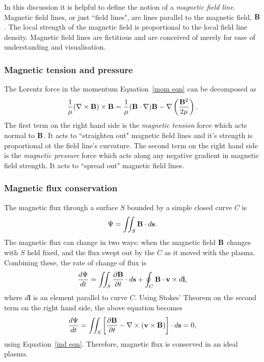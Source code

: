 \documentclass[12pt]{../style-files/ociamthesis}
\begin{document}
In this discussion it is helpful to define the notion of a \textit{magnetic field line}. Magnetic field lines, or just ``field lines", are lines parallel to the magnetic field, $\mathbf{B}$. The local strength of the magnetic field is proportional to the local field line density. Magnetic field lines are fictitious and are conceived of merely for ease of understanding and visualisation.


\subsubsection{Magnetic tension and pressure}
The Lorentz force in the momentum Equation~\eqref{mom eqn} can be decomposed as
\begin{equation}
	\frac{1}{\mu}(\nabla\times\mathbf{B})\times\mathbf{B} = \frac{1}{\mu}(\mathbf{B}\cdot\nabla)\mathbf{B} - \nabla\left(\frac{\mathbf{B}^2}{2\mu}\right).
\end{equation}
The first term on the right hand side is the \textit{magnetic tension} force which acts normal to $\mathbf{B}$. It acts to ``straighten out" magnetic field lines and it's strength is proportional ot the field line's curvature. The second term on the right hand side is the \textit{magnetic pressure} force which acts along any negative gradient in magnetic field strength. It acts to ``spread out" magnetic field lines.


\subsubsection{Magnetic flux conservation} \label{sec: mag flux conservation}
The magnetic flux through a surface $S$ bounded by a simple closed curve $C$ is
\begin{equation}
	\Psi = \iint_S \mathbf{B}\cdot d\mathbf{s}.
\end{equation}
The magnetic flux can change in two ways: when the magnetic field $\mathbf{B}$ changes with $S$ held fixed, and the flux swept out by the $C$ as it moved with the plasma. Combining these, the rate of change of flux is
\begin{equation}
	\frac{d \Psi}{dt} = \iint_S \frac{\partial\mathbf{B}}{\partial t}\cdot d\mathbf{s} + \oint_C \mathbf{B}\cdot \mathbf{v} \times d\mathbf{l},
\end{equation}
where $d\mathbf{l}$ is an element parallel to curve $C$. Using Stokes' Theorem on the second term on the right hand side, the above equation becomes
\begin{equation}
\frac{d \Psi}{dt} = \iint_S \left[ \frac{\partial\mathbf{B}}{\partial t} - \nabla\times(\mathbf{v}\times\mathbf{B}) \right] \cdot d\mathbf{s} = 0,
\end{equation}
using Equation~\eqref{ind eqn}. Therefore, magnetic flux is conserved in an ideal plasma.
\end{document}
